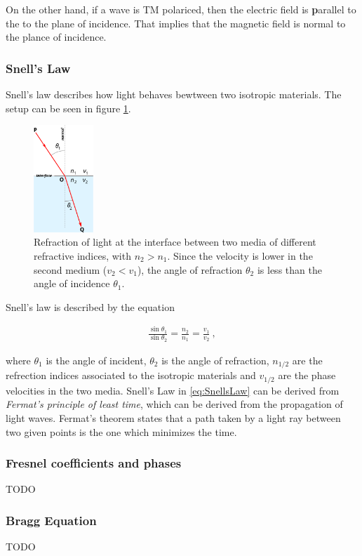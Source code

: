 On the other hand, if a wave is TM polariced, then the electric field is \textbf{p}arallel to the to the plane of incidence. That implies that the magnetic field is normal to the plance of incidence.

\subsubsection{Snell's Law}

Snell's law describes how light behaves bewtween two isotropic materials. The setup can be seen in figure \ref{fig:snellsLaw}.

\begin{figure}[h!]
    \centering
    \includegraphics[width=0.2\textwidth]{figures/SnellsLaw2.png}
    \caption{Refraction of light at the interface between two media of different refractive indices, with $n_2 > n_1$. Since the velocity is lower in the second medium ($v_2 < v_1$), the angle of refraction $\theta_2$ is less than the angle of incidence $\theta_1$.}
    \label{fig:snellsLaw}
\end{figure}

Snell's law is described by the equation 

\begin{align}
\frac{\sin \theta_1}{\sin \theta_2} = \frac{n_2}{n_1} = \frac{v_1}{v_2}~,
\label{eq:SnellsLaw}
\end{align}

where $\theta_1$ is the angle of incident, $\theta_2$ is the angle of refraction, $n_{1/2}$ are the refrection indices associated to the isotropic materials and $v_{1/2}$ are the phase velocities in the two media. Snell's Law in \ref{eq:SnellsLaw} can be derived from \textit{Fermat's principle of least time}, which can be derived from the propagation of light waves. Fermat's theorem states that a path taken by a light ray between two given points is the one which minimizes the time.

\subsubsection{Fresnel coefficients and phases}

TODO


\subsubsection{Bragg Equation}


TODO
